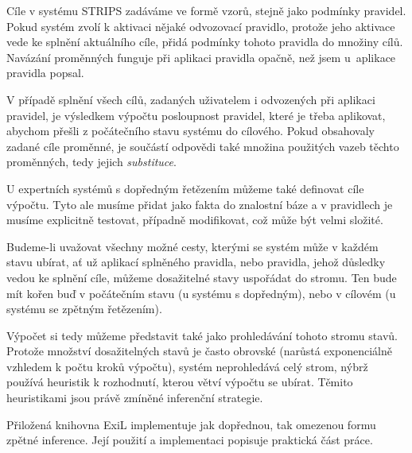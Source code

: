 Cíle v systému STRIPS zadáváme ve formě vzorů, stejně jako podmínky pravidel.
Pokud systém zvolí k aktivaci nějaké odvozovací pravidlo, protože jeho aktivace
vede ke splnění aktuálního cíle, přidá podmínky tohoto pravidla do množiny
cílů. Navázání proměnných funguje při aplikaci pravidla opačně, než jsem
u~aplikace pravidla popsal.

V případě splnění všech cílů, zadaných uživatelem i odvozených při aplikaci
pravidel, je výsledkem výpočtu posloupnost pravidel, které je třeba aplikovat,
abychom přešli z počátečního stavu systému do cílového. Pokud obsahovaly zadané
cíle proměnné, je součástí odpovědi také množina použitých vazeb těchto
proměnných, tedy jejich \emph{substituce}.

U expertních systémů s dopředným řetězením můžeme také definovat cíle výpočtu.
Tyto ale musíme přidat jako fakta do znalostní báze a v pravidlech je musíme
explicitně testovat, případně modifikovat, což může být velmi složité.

Budeme-li uvažovat všechny možné cesty, kterými se systém může v každém stavu
ubírat, ať už aplikací splněného pravidla, nebo pravidla, jehož důsledky vedou
ke splnění cíle, můžeme dosažitelné stavy uspořádat do stromu. Ten bude mít
kořen buď v počátečním stavu (u systému s dopředným), nebo v cílovém (u systému
se zpětným řetězením).

Výpočet si tedy můžeme představit také jako prohledávání tohoto stromu stavů.
Protože množství dosažitelných stavů je často obrovské (narůstá exponenciálně
vzhledem k počtu kroků výpočtu), systém neprohledává celý strom, nýbrž používá
heuristik k rozhodnutí, kterou větví výpočtu se ubírat.  Těmito heuristikami
jsou právě zmíněné inferenční strategie.

Přiložená knihovna ExiL implementuje jak dopřednou, tak omezenou formu zpětné
inference. Její použití a implementaci popisuje praktická část práce.
